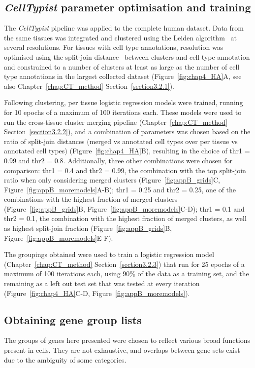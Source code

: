 \subsection{\textit{CellTypist} parameter optimisation and training}
\label{section4.4_model}
The \textit{CellTypist} pipeline was applied to the complete human dataset. Data from the same tissues was integrated and clustered using the Leiden algorithm~\citep{traag_louvain_2019} at several resolutions. For tissues with cell type annotations, resolution was optimised using the split-join distance~\citep{dongen_performance_2000} between clusters and cell type annotation and constrained to a number of clusters at least as large as the number of cell type annotations in the largest collected dataset (Figure~\ref{fig:chap4_HA}A, see also Chapter~\ref{chap:CT_method} Section~\ref{section3.2.1}).

Following clustering, per tissue logistic regression models were trained, running for 10 epochs of a maximum of 100 iterations each. These models were used to run the cross-tissue cluster merging pipeline (Chapter~\ref{chap:CT_method} Section~\ref{section3.2.2}), and a combination of parameters was chosen based on the ratio of split-join distances (merged vs annotated cell types over per tissue vs annotated cell types) (Figure~\ref{fig:chap4_HA}B), resulting in the choice of thr1 = 0.99 and thr2 = 0.8. Additionally, three other combinations were chosen for comparison: thr1 = 0.4 and thr2 = 0.99, the combination with the top split-join ratio when only considering merged clusters (Figure~\ref{fig:appB_grids}C, Figure~\ref{fig:appB_moremodels}A-B); thr1 = 0.25 and thr2 = 0.25, one of the combinations with the highest fraction of merged clusters (Figure~\ref{fig:appB_grids}B, Figure~\ref{fig:appB_moremodels}C-D); thr1 = 0.1 and thr2 = 0.1, the combination with the highest fraction of merged clusters, as well as highest split-join fraction (Figure~\ref{fig:appB_grids}B, Figure~\ref{fig:appB_moremodels}E-F).

The groupings obtained were used to train a logistic regression model (Chapter~\ref{chap:CT_method} Section~\ref{section3.2.3}) that run for 25 epochs of a maximum of 100 iterations each, using 90\% of the data as a training set, and the remaining as a left out test set that was tested at every iteration (Figure~\ref{fig:chap4_HA}C-D, Figure~\ref{fig:appB_moremodels}).


\subsection{Obtaining gene group lists}
\label{section4.4_genelists}
The groups of genes here presented were chosen to reflect various broad functions present in cells. They are not exhaustive, and overlaps between gene sets exist due to the ambiguity of some categories.

